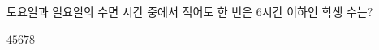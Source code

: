 토요일과 일요일의 수면 시간 중에서 적어도 한 번은 6시간 이하인 학생 수는?
\begin{choices32}{$4$}{$5$}{$6$}{$7$}{$8$}\end{choices32}
